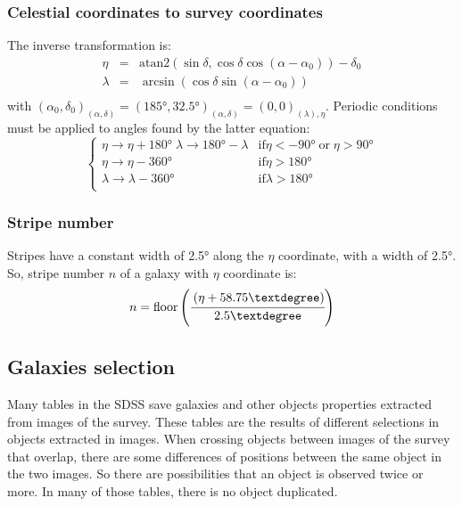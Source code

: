 \subsubsection{Celestial coordinates to survey coordinates}
%
The inverse transformation is:
%
\begin{eqnarray}
    \eta &=& \mathrm{atan2}\left(\sin\delta,\cos\delta\cos\left(\alpha-\alpha_0\right)\right)-\delta_0\nonumber\\
    \lambda &=& \arcsin\left(\cos\delta\sin\left(\alpha-\alpha_0\right)\right)\nonumber\\
\end{eqnarray}
%
with
${(\alpha_0,\delta_0)}_{(\alpha,\delta)}={(185°,32.5°)}_{(\alpha,\delta)}={(0,0)}_{(\lambda),
\eta}$. Periodic conditions must be applied to angles found by the latter
equation:
%
\begin{equation}
    \begin{cases}
        \eta\rightarrow\eta+180° \; \lambda\rightarrow180°-\lambda&
        \mbox{if} \eta<-90°\;\mbox{or}\; \eta>90°\\
        \eta\rightarrow\eta-360° &
        \mbox{if} \eta>180°\\
        \lambda\rightarrow\lambda-360° &
        \mbox{if} \lambda>180°\\
    \end{cases}
\end{equation}
%
\subsubsection{Stripe number}
%
Stripes have a constant width of 2.5° along the $\eta$ coordinate, with a
width of 2.5°. So, stripe number $n$ of a galaxy with $\eta$ coordinate is:
%
\begin{equation}
    n = \mathrm{floor}\left(\cfrac{\left(\eta+58.75°\right)}{2.5°}\right)
\end{equation}
%
\subsection{Galaxies selection}
%
Many tables in the SDSS save galaxies and other objects properties extracted
from images of the survey. These tables are the results of different
selections in objects extracted in images. When crossing objects between
images of the survey that overlap, there are some differences of positions
between the same object in the two images. So there are possibilities that
an object is observed twice or more. In many of those tables, there is no
object duplicated.

